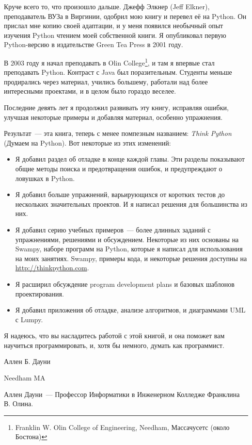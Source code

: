 Круче всего то, что произошло дальше. Джефф Элкнер (Jeff Elkner), преподаватель
ВУЗа в Виргинии, одобрил мою книгу и перевел её на Python. Он прислал мне копию
своей адаптации, и у меня появился необычный опыт изучения Python чтением моей
собственной книги. Я опубликовал первую Python-версию в издательстве Green Tea
Press в 2001 году.

В 2003 году я начал преподавать в Olin College\footnote{Franklin W.
Olin College of Engineering,  Needham, Массачусетс (около Бостона)}, и там я
впервые стал преподавать Python. Контраст с Java был поразительным. Студенты
меньше продирались через материал, учились большему, работали над более
интересными проектами, и в целом было гораздо веселее. 

Последние девять лет я продолжил развивать эту книгу, исправляя ошибки, улучшая
некоторые примеры и добавляя материал, особенно упражнения.

Результат\ --- эта книга, теперь с менее помпезным названием: \emph{Think
Python} (Думаем на Python). Вот некоторые из этих изменений:

\begin{itemize}
\item Я добавил раздел об отладке в конце каждой главы. Эти разделы показывают
общие методы поиска и предотвращения ошибок, и предупреждают о ловушках в
Python.
\item Я добавил больше упражнений, варьирующихся от коротких тестов до
нескольких значительных проектов. И я написал решения для большинства из них.
\item Я добавил серию учебных примеров\ --- более длинных заданий с
упражнениями, решениями и обсуждением. Некоторые из них основаны на Swampy,
наборе программ на Python, которые я написал для использования на моих занятиях.
Swampy, примеры кода, и некоторые решения доступны на
\url{http://thinkpython.com}.
\item Я расширил обсуждение program development plans и базовых шаблонов
проектирования.
\item Я добавил приложения об отладке, анализе алгоритмов, и диаграммами UML с
Lumpy.
\end{itemize}

\bigskip
Я надеюсь, что вы насладитесь работой с этой книгой, и она поможет вам научиться
программировать, и, хотя бы немного, думать как программист.

\bigskip
Аллен Б. Дауни 

Needham MA 

\bigskip
Аллен Дауни\ --- Профессор Информатики в Инженерном Колледже Франклина В. Олина.

